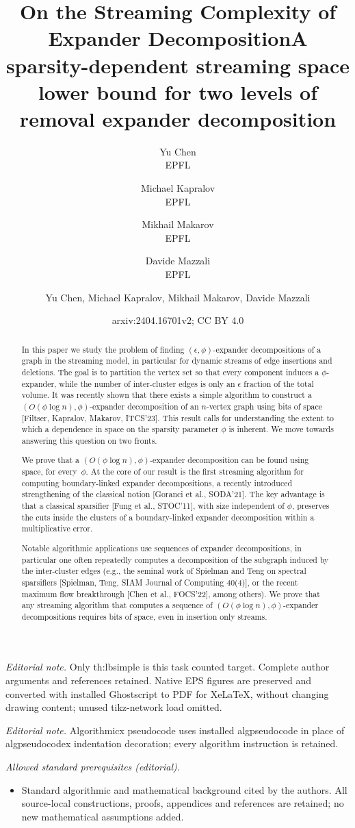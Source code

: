 \documentclass[epsfig,letter,11pt]{article}
\title{On the Streaming Complexity of Expander Decomposition}
\author{
	Yu Chen\\
	EPFL\\
	\and
	Michael Kapralov\\
	EPFL\\
	\and
	Mikhail Makarov\\
	EPFL\\
	\and
	Davide Mazzali\\
	EPFL\\}
\date{}
\title{A sparsity-dependent streaming space lower bound for two levels of removal expander decomposition}
\author{Yu Chen, Michael Kapralov, Mikhail Makarov, Davide Mazzali}
\date{arxiv:2404.16701v2; CC BY 4.0}
\numberwithin{equation}{section}
\begin{document}
\maketitle
\noindent\textit{Editorial note.} Only th:lbsimple is this task counted target. Complete author arguments and references retained. Native EPS figures are preserved and converted with installed Ghostscript to PDF for XeLaTeX, without changing drawing content; unused tikz-network load omitted.\par\medskip
\noindent\textit{Editorial note.} Algorithmicx pseudocode uses installed algpseudocode in place of algpseudocodex indentation decoration; every algorithm instruction is retained.\par\medskip
\noindent\textit{Allowed standard prerequisites (editorial).}\begin{itemize}
\item Standard algorithmic and mathematical background cited by the authors. All source-local constructions, proofs, appendices and references are retained; no new mathematical assumptions added.
\end{itemize}\medskip
\thispagestyle{empty}
\begin{abstract}
\noindent
In this paper we study the problem of finding $(\epsilon, \phi)$-expander decompositions of a graph in the streaming model, in particular for dynamic streams of edge insertions and deletions. The goal is to partition the vertex set so that every component induces a $\phi$-expander, while the number of inter-cluster edges is only an $\epsilon$ fraction of the total volume. It was recently shown that there exists a simple algorithm to construct a $(O(\phi \log n), \phi)$-expander decomposition of an $n$-vertex graph using  bits of space [Filtser, Kapralov, Makarov, ITCS'23]. This result calls for understanding the extent to which a dependence in space on the sparsity parameter $\phi$ is inherent. We move towards answering this question on two fronts.

We prove that a $(O(\phi \log n), \phi)$-expander decomposition can be found using~ space, for every~$\phi$.  At the core of our result is the first streaming algorithm for computing boundary-linked expander decompositions, a recently introduced strengthening of the classical notion [Goranci et al., SODA'21]. The key advantage is that a classical sparsifier [Fung et al., STOC'11], with size independent of $\phi$, preserves the cuts inside the clusters of a boundary-linked expander decomposition within a multiplicative error.

Notable algorithmic applications use sequences of expander decompositions, in particular one often repeatedly computes a decomposition of the subgraph induced by the inter-cluster edges (e.g., the seminal work of Spielman and Teng on spectral sparsifiers [Spielman, Teng, SIAM Journal of Computing 40(4)], or the recent maximum flow breakthrough [Chen et al., FOCS'22], among others). We prove that any streaming algorithm that computes a sequence of $(O(\phi \log n), \phi)$-expander decompositions requires  bits of space, even in insertion only streams.
\end{abstract}
\end{document}
